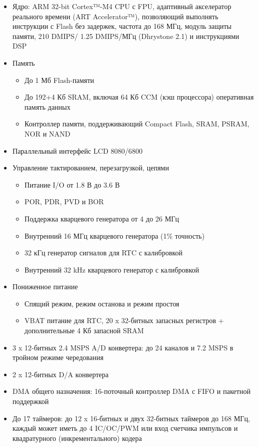 \documentclass[document.tex]{subfiles}
\begin{document}
\begin{itemize}
	\item Ядро: ARM 32-bit Cortex™-M4 CPU с FPU,
адаптивный акселератор реального времени (ART
Accelerator™), позволяющий выполнять инструк\-ции с Flash без задержек, частота до 168 МГц,
модуль защиты памяти, 210 DMIPS/ 1.25 DMIPS/МГц (Dhrystone 2.1) и инструкциями DSP
	\item Память
	\begin{itemize}
		\item До 1 Мб Flash-памяти
		\item До 192+4 Кб SRAM, включая 64 Кб CCM (кэш процессора) оператив\-ная память данных
		\item Контроллер памяти, поддерживающий Compact Flash, SRAM, PSRAM, NOR и NAND
	\end{itemize}
	\item Параллельный интерфейс LCD 8080/6800
	\item Управление тактированием, перезагрузкой, цепями
	\begin{itemize}
		\item Питание I/O от 1.8 В до 3.6 В
		\item POR, PDR, PVD и BOR
		\item Поддержка кварцевого генератора от 4 до 26 МГц
		\item Внутренний 16 МГц кварцевого генератора (1\% точность)
		\item 32 кГц генератор сигналов для RTC с калибровкой
		\item Внутренний 32 kHz кварцевого генератор с калибровкой
	\end{itemize}
	\item Пониженное питание
	\begin{itemize}
		\item Спящий режим, режим останова и режим простоя
		\item VBAT питание для RTC, 20 x 32-битных запасных регистров + допол\-нительные 4 Кб запасной SRAM
	\end{itemize}
	\item 3 x 12-битных 2.4 MSPS A/D конвертера: до 24 каналов и 7.2 MSPS в тройном режиме чередования
	\item 2 x 12-битных D/A конвертера 
	\item DMA общего назначения: 16-поточный контроллер DMA с FIFO и пакетной поддержкой
	\item До 17 таймеров: до 12 x 16-битных и двух 32-битных таймеров до 168 МГц, каждый может иметь до 4
IC/OC/PWM или вход счетчика импульсов и квадратурного (инкре\-ментального) кодера

\end{itemize}
\end{document}
